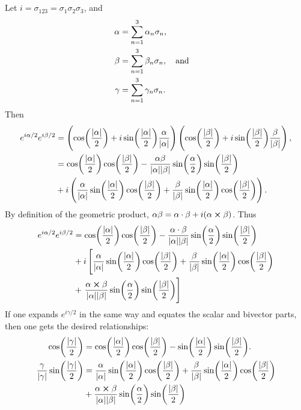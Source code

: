 \documentclass[a4paper,12pt,twoside]{article}
\begin{document}
\subsection{}%
Let $i = \sigma_{123} = \sigma_1\sigma_2\sigma_3$, and
\begin{align}
	\alpha &= \sum_{n=1}^3 \alpha_n\sigma_n,\\
	\beta &= \sum_{n=1}^3 \beta_n\sigma_n, \qq{and}\\
	\gamma &= \sum_{n=1}^3 \gamma_n\sigma_n.
\end{align}
Then
\begin{align}
	e^{i\alpha/2}e^{i\beta/2} &= \left(\cos(\frac{\abs{\alpha}}{2}) + i\sin(\frac{\abs{\alpha}}{2})\frac{\alpha}{\abs{\alpha}}\right)
	\left(\cos(\frac{\abs{\beta}}{2}) + i\sin(\frac{\abs{\beta}}{2})\frac{\beta}{\abs{\beta}}\right),\\
	&= \cos(\frac{\abs{\alpha}}{2})\cos(\frac{\abs{\beta}}{2})
	- \frac{\alpha\beta}{\abs{\alpha}\abs{\beta}} \sin(\frac{\alpha}{2})\sin(\frac{\abs{\beta}}{2})\\
	&+ i\left(\frac{\alpha}{\abs{\alpha}} \sin(\frac{\abs{\alpha}}{2}) \cos(\frac{\abs{\beta}}{2})
	+ \frac{\beta}{\abs{\beta}} \sin(\frac{\abs{\alpha}}{2}) \cos(\frac{\abs{\beta}}{2})\right).
\end{align}
By definition of the geometric product, $\alpha\beta = \alpha\cdot\beta + i(\alpha\cross\beta)$.
Thus
\begin{align}
	e^{i\alpha/2}e^{i\beta/2}
	&= \cos(\frac{\abs{\alpha}}{2})\cos(\frac{\abs{\beta}}{2})-\frac{\alpha\cdot\beta}{\abs{\alpha}\abs{\beta}} \sin(\frac{\alpha}{2})\sin(\frac{\abs{\beta}}{2})\nonumber\\
	&+ i\left[ \frac{\alpha}{\abs{\alpha}} \sin(\frac{\abs{\alpha}}{2}) \cos(\frac{\abs{\beta}}{2})
	+ \frac{\beta}{\abs{\beta}} \sin(\frac{\abs{\alpha}}{2}) \cos(\frac{\abs{\beta}}{2}) \right.\nonumber\\
	&+ \left. \frac{\alpha \cross \beta}{\abs{\alpha}\abs{\beta}} \sin(\frac{\alpha}{2})\sin(\frac{\abs{\beta}}{2})\right]
\end{align}
If one expands $e^{i\gamma/2}$ in the same way and equates the scalar and bivector parts, then one gets the desired relationships:
\begin{align}
	\cos(\frac{\abs{\gamma}}{2}) &= \cos(\frac{\abs{\alpha}}{2})\cos(\frac{\abs{\beta}}{2})
	- \sin(\frac{\abs{\alpha}}{2})\sin(\frac{\abs{\beta}}{2}).\\
	\frac{\gamma}{\abs{\gamma}} \sin(\frac{\abs{\gamma}}{2}) &= \frac{\alpha}{\abs{\alpha}} \sin(\frac{\abs{\alpha}}{2}) \cos(\frac{\abs{\beta}}{2})
	+ \frac{\beta}{\abs{\beta}} \sin(\frac{\abs{\alpha}}{2}) \cos(\frac{\abs{\beta}}{2})\nonumber\\
	&+ \frac{\alpha \cross \beta}{\abs{\alpha}\abs{\beta}} \sin(\frac{\alpha}{2})\sin(\frac{\abs{\beta}}{2})
\end{align}
\end{document}
